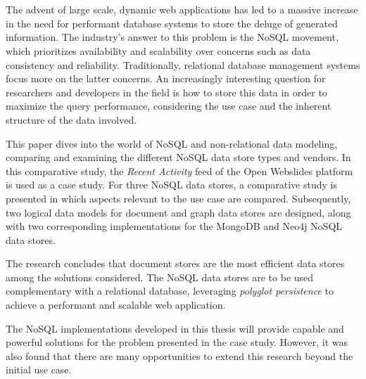 \chapter*{}

The advent of large scale, dynamic web applications has led to a massive increase in the need for performant database systems to store the deluge of generated information.
The industry's answer to this problem is the NoSQL movement, which prioritizes availability and scalability over concerns such as data consistency and reliability.
Traditionally, relational database management systems focus more on the latter concerns.
An increasingly interesting question for researchers and developers in the field is how to store this data in order to maximize the query performance, considering the use case and the inherent structure of the data involved.

This paper dives into the world of NoSQL and non-relational data modeling, comparing and examining the different NoSQL data store types and vendors.
In this comparative study, the \textit{Recent Activity} feed of the Open Webslides platform is used as a case study.
For three NoSQL data stores, a comparative study is presented in which aspects relevant to the use case are compared.
Subsequently, two logical data models for document and graph data stores are designed, along with two corresponding implementations for the MongoDB and Neo4j NoSQL data stores.

The research concludes that document stores are the most efficient data stores among the solutions considered.
The NoSQL data stores are to be used complementary with a relational database, leveraging \textit{polyglot persistence} to achieve a performant and scalable web application.

The NoSQL implementations developed in this thesis will provide capable and powerful solutions for the problem presented in the case study.
However, it was also found that there are many opportunities to extend this research beyond the initial use case.
